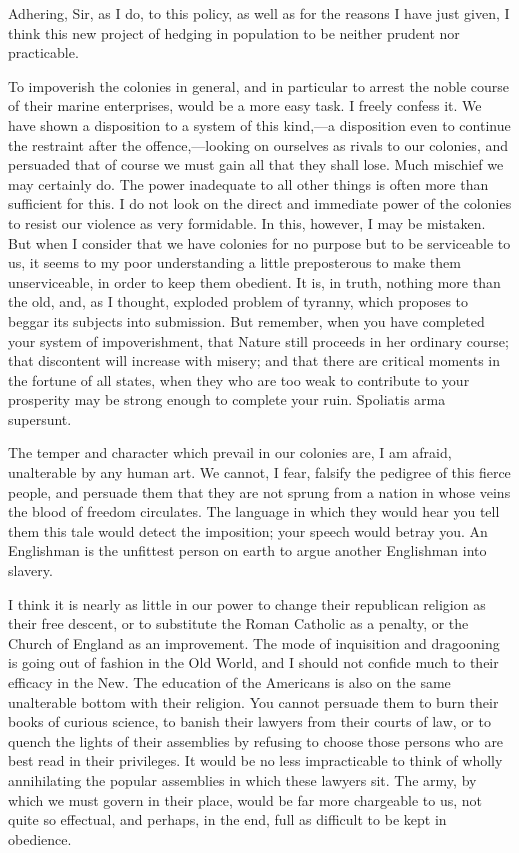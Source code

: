 Adhering, Sir, as I do, to this policy, as well as for the reasons I have just given, I think this new project of hedging in population to be neither prudent nor practicable.

To impoverish the colonies in general, and in particular to arrest the noble course of their marine enterprises, would be a more easy task. I freely confess it. We have shown a disposition to a system of this kind,—a disposition even to continue the restraint after the offence,—looking on ourselves as rivals to our colonies, and persuaded that of course we must gain all that they shall lose. Much mischief we may certainly do. The power inadequate to all other things is often more than sufficient for this. I do not look on the direct and immediate power of the colonies to resist our violence as very formidable. In this, however, I may be mistaken. But when I consider that we have colonies for no purpose but to be serviceable to us, it seems to my poor understanding a little preposterous to make them unserviceable, in order to keep them obedient. It is, in truth, nothing more than the old, and, as I thought, exploded problem of tyranny, which proposes to beggar its subjects into submission. But remember, when you have completed your system of impoverishment, that Nature still proceeds in her ordinary course; that discontent will increase with misery; and that there are critical moments in the fortune of all states, when they who are too weak to contribute to your prosperity may be strong enough to complete your ruin. Spoliatis arma supersunt.

The temper and character which prevail in our colonies are, I am afraid, unalterable by any human art. We cannot, I fear, falsify the pedigree of this fierce people, and persuade them that they are not sprung from a nation in whose veins the blood of freedom circulates. The language in which they would hear you tell them this tale would detect the imposition; your speech would betray you. An Englishman is the unfittest person on earth to argue another Englishman into slavery.

I think it is nearly as little in our power to change their republican religion as their free descent, or to substitute the Roman Catholic as a penalty, or the Church of England as an improvement. The mode of inquisition and dragooning is going out of fashion in the Old World, and I should not confide much to their efficacy in the New. The education of the Americans is also on the same unalterable bottom with their religion. You cannot persuade them to burn their books of curious science, to banish their lawyers from their courts of law, or to quench the lights of their assemblies by refusing to choose those persons who are best read in their privileges. It would be no less impracticable to think of wholly annihilating the popular assemblies in which these lawyers sit. The army, by which we must govern in their place, would be far more chargeable to us, not quite so effectual, and perhaps, in the end, full as difficult to be kept in obedience.

